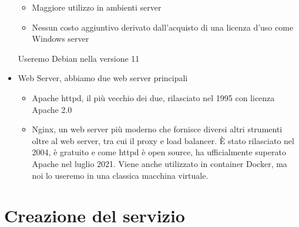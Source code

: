 \begin{itemize}
\begin{itemize}
        \item Maggiore utilizzo in ambienti server
        \item Nessun costo aggiuntivo derivato dall'acquisto di una licenza d'uso come Windows server
    \end{itemize}
    Useremo Debian nella versione 11
    \item Web Server, abbiamo due web server principali 
    \begin{itemize}
        \item Apache httpd, il più vecchio dei due, rilasciato nel 1995 con licenza Apache 2.0
        \item Nginx, un web server più moderno che fornisce diversi altri strumenti oltre al web server, tra cui il proxy e load balancer. È stato rilasciato nel 2004, è gratuito e come httpd è open source, ha ufficialmente superato Apache nel luglio 2021\cite{WebServerHistory}. Viene anche utilizzato in container Docker, ma noi lo useremo in una classica macchina virtuale.
    \end{itemize}
\end{itemize}

\newpage
\section{Creazione del servizio}

